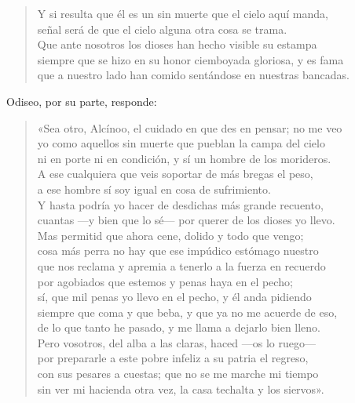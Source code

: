 \begin{verse}
Y si resulta que él es un sin muerte que el cielo aquí manda,\\
señal será de que el cielo alguna otra cosa se trama.\\
Que ante nosotros los dioses han hecho visible su estampa\\
siempre que se hizo en su honor ciemboyada gloriosa, y es fama\\
que a nuestro lado han comido sentándose en nuestras bancadas.
\end{verse}

Odiseo, por su parte, responde:

\begin{verse}
«Sea otro, Alcínoo, el cuidado en que des en pensar; no me veo\\
yo como aquellos sin muerte que pueblan la campa del cielo\\
ni en porte ni en condición, y sí un hombre de los morideros.\\
A ese cualquiera que veis soportar de más bregas el peso,\\
a ese hombre sí soy igual en cosa de sufrimiento.\\
Y hasta podría yo hacer de desdichas más grande recuento,\\
cuantas ---y bien que lo sé--- por querer de los dioses yo llevo.\\
Mas permitid que ahora cene, dolido y todo que vengo;\\
cosa más perra no hay que ese impúdico estómago nuestro\\
que nos reclama y apremia a tenerlo a la fuerza en recuerdo\\
por agobiados que estemos y penas haya en el pecho;\\
sí, que mil penas yo llevo en el pecho, y él anda pidiendo\\
siempre que coma y que beba, y que ya no me acuerde de eso,\\
de lo que tanto he pasado, y me llama a dejarlo bien lleno.\\
Pero vosotros, del alba a las claras, haced ---os lo ruego---\\
por prepararle a este pobre infeliz a su patria el regreso,\\
con sus pesares a cuestas; que no se me marche mi tiempo\\
sin ver mi hacienda otra vez, la casa techalta y los siervos».
\end{verse}

